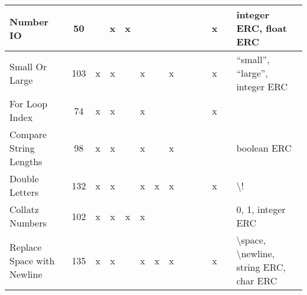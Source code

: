 \documentclass{sig-alternate}
\begin{document}
\begin{table*}[t]
\begin{tabular}{|>{\raggedright}p{3.1cm}|c|ccccccccccc|>{\raggedright}p{5.5cm}|}
\hline
\hline
Number IO                  & 50              &      & x       & x     &         &      &        &                    &                  &                   & x     &            & integer ERC, float ERC                                                                                                                                                                                                      \tabularnewline
\hline
Small Or Large             & 103             & x    & x       &       & x       &      & x      &                    &                  &                   & x     &            & ``small'', ``large'', integer ERC                                                                                                                                                                                               \tabularnewline
\hline
For Loop Index             & 74              & x    & x       &       & x       &      &        &                    &                  &                   & x     &            &                                                                                                                                                                                                                             \tabularnewline
\hline
Compare String Lengths     & 98              & x    & x       &       & x       &      & x      &                    &                  &                   &       &            & boolean ERC                                                                                                                                                                                                                 \tabularnewline
\hline
Double Letters             & 132             & x    & x       &       & x       & x    & x      &                    &                  &                   & x     &            & \textbackslash !                                                                                                                                                                                                            \tabularnewline
\hline
Collatz Numbers            & 102             & x    & x       & x     & x       &      &        &                    &                  &                   &       &            & 0, 1, integer ERC                                                                                                                                                                                                           \tabularnewline
\hline
Replace Space with Newline & 135             & x    & x       &       & x       & x    & x      &                    &                  &                   & x     &            & \textbackslash space, \textbackslash newline, string ERC, char ERC                                                                                                                                                          \tabularnewline

\end{tabular}
\end{table*}
\end{document}
